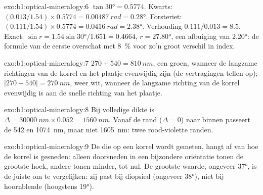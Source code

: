 \begin{solution}{exo:b1:optical-mineralogy:6}
$\tan\ang{30} = 0.5774$. Kwarts: $(0.013/1.54)\times0.5774 = \qty{0.00487}{rad}
= \ang{0.28}$. Forsteriet: $(0.111/1.54)\times0.5774 = \qty{0.0416}{rad} =
\ang{2.38}$. Verhouding $0.111/0.013 = 8.5$. Exact: $\sin r = 1.54\sin\ang{30}/1.651
= 0.4664$, $r = \ang{27.80}$, een afbuiging van \ang{2.20}: de formule van de eerste 
overschat met \qty{8}{\percent} voor zo'n groot verschil in index.
\end{solution}

\begin{solution}{exo:b1:optical-mineralogy:7}
$270 + 540 = \qty{810}{nm}$, een  groen, wanneer de langzame richtingen van de korrel en het
plaatje evenwijdig zijn (de vertragingen tellen op); $|270 - 540| =
\qty{270}{nm}$, weer  wit, wanneer de langzame richting van de korrel evenwijdig is aan de
snelle richting van het plaatje.
\end{solution}

\begin{solution}{exo:b1:optical-mineralogy:8}
Bij volledige dikte is $\Delta = \qty{30000}{nm}\times0.052 = \qty{1560}{nm}$. Vanaf de rand ($\Delta = 0$)
naar binnen passeert de  542 en \qty{1074}{nm}, maar niet \qty{1605}{nm}: twee rood-violette randen.
\end{solution}

\begin{solution}{exo:b1:optical-mineralogy:9}
De  die op een korrel wordt gemeten, hangt af van hoe de korrel is gesneden: alleen doorsneden in een
bijzondere oriëntatie tonen de grootste hoek, andere tonen minder, tot nul. De grootste waarde, ongeveer \ang{37}, is
de juiste om te vergelijken: zij past bij diopsied (ongeveer \ang{38}), niet bij hoornblende (hoogstens
\ang{19}).
\end{solution}

